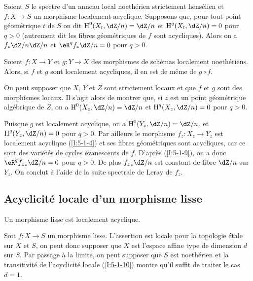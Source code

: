 \begin{corollary}\label{I:5-1-9}
Soient $S$ le spectre d'un anneau local noethérien strictement hensélien et 
$f:X\to S$ un morphisme localement acyclique. Supposons que, pour tout point 
géométrique $t$ de $S$ on dit $\h^0(X_t,\dZ/n) = \dZ/n$ et 
$\h^q(X_t,\dZ/n) = 0$ pour $q>0$ (autrement dit les fibres géométriques de 
$f$ sont acycliques). Alors on a $f_* \dZ/n\dZ/n$ et $\eR^qf_*\dZ/n = 0$ pour 
$q>0$. 
\end{corollary}





\begin{corollary}\label{I:5-1-10}
Soient $f:X\to Y$ et $g:Y\to X$ des morphismes de schémas localement 
noethériens. Alors, si $f$ et $g$ sont localement acycliques, il en est de 
même de $g\circ f$. 
\end{corollary}

On peut supposer que $X$, $Y$ et $Z$ sont strictement locaux et que $f$ et $g$ 
sont des morphismes locaux. Il s'agit alors de montrer que, si $z$ est un point 
géométrique algébrique de $Z$, on a $\h^0(X_z,\dZ/n) = \dZ/n$ et 
$\h^q(X_z,\dZ/n) = 0$ pour $q>0$. 

Puisque $g$ est localement acyclique, on a $\h^0(Y_z,\dZ/n) = \dZ/n$, et 
$\h^q(Y_z,\dZ/n) = 0$ pour $q>0$. Par ailleurs le morphisme $f_z:X_z\to Y_z$ est 
localement acyclique (\ref{I:5-1-4}) et ses fibres géométriques sont 
acycliques, car ce sont des variétés de cycles évanescents de $f$. 
D'après (\ref{I:5-1-9}), on a donc $\eR^q {f_z}_*\dZ/n = 0$ pour $q>0$. De plus 
${f_z}_*\dZ/n$ est constant de fibre $\dZ/n$ sur $Y_z$. On conclut à l'aide de 
la suite spectrale de Leray de $f_z$. 










\subsection{Acyclicité locale d'un morphisme lisse}\label{I:5-2}





\begin{theorem}\label{I:5-2-1}
Un morphisme lisse est localement acyclique.
\end{theorem}

Soit $f:X\to S$ un morphisme lisse. L'assertion est locale pour la topologie 
étale sur $X$ et $S$, on peut donc supposer que $X$ est l'espace affine type 
de dimension $d$ sur $S$. Par passage à la limite, on peut supposer que $S$ 
est noethérien et la transitivité de l'acyclicité locale (\ref{I:5-1-10}) montre 
qu'il suffit de traiter le cas $d=1$. 

